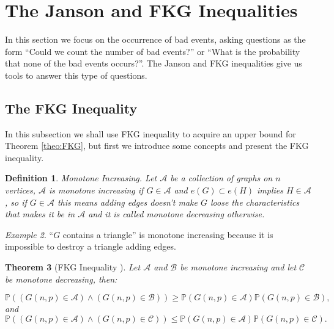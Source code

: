 \documentclass[12pt,twoside,a4paper,bibliography=totocnumbered]{book}
\numberwithin{equation}{section}
\newtheorem{theorem}             {Theorem}[section]
\newtheorem{definition}	[theorem] {Definition}
\theoremstyle{remark}
\newtheorem{example}	[theorem] {Example}
\begin{document}
\section{The Janson and FKG Inequalities}

In this section we focus on the occurrence of  bad events, asking questions as the form ``Could we count the number of bad events?'' or ``What is the probability that none of the bad events occurs?''. The Janson and FKG inequalities give us tools to answer this type of questions.

\subsection{The FKG Inequality}
In this subsection we shall use FKG inequality to acquire an upper bound for Theorem \ref{theo:FKG}, but first we introduce some concepts and present the FKG inequality.

\begin{definition}
Monotone Increasing. Let $\mathcal{A}$ be a collection of graphs on $n$ vertices, $\mathcal{A}$ is monotone increasing if $G \in \mathcal{A}$ and $e(G) \subset e(H)$ implies $H \in \mathcal{A}$, so if $G \in \mathcal{A}$ this means adding edges doesn't make $G$ loose the characteristics that makes it be in $\mathcal{A}$ and it is called monotone decreasing otherwise.     
\end{definition}

\begin{example}
``$G$ contains a triangle'' is monotone increasing because it is impossible to destroy a triangle adding edges.
\end{example}

\begin{theorem} [{FKG Inequality \cite{FKG71}}]
 Let $\mathcal{A}$ and $\mathcal{B}$ be monotone increasing and let $\mathcal{C}$ be monotone decreasing, then:

$$ \mathbb{P}((G(n,p) \in \mathcal{A}) \wedge (G(n,p) \in \mathcal{B})) \geq \mathbb{P}(G(n,p) \in \mathcal{A})\mathbb{P}(G(n,p) \in \mathcal{B}),$$
and
$$ \mathbb{P}((G(n,p) \in \mathcal{A}) \wedge (G(n,p) \in \mathcal{C})) \leq \mathbb{P}(G(n,p) \in \mathcal{A})\mathbb{P}(G(n,p) \in \mathcal{C}).$$
\end{theorem}
\end{document}

